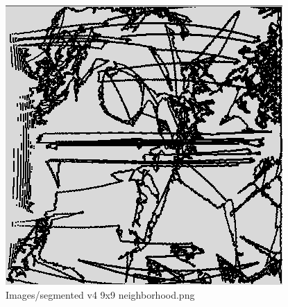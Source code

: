 \begin{figure}[H]
\includegraphics[width=\textwidth]{Images/segmented_v4_9x9_neighborhood.png}
\caption{Images/segmented v4 9x9 neighborhood.png}
\label{fig:Images/segmented v4 9x9 neighborhood.png}
\end{figure}
